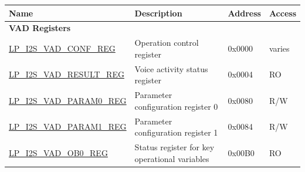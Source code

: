 \begin{longtable}{ | p{6cm} | p{7.2cm} | p{1.3cm} | p{1cm} | }
\hline\rowcolor{lightgray}
\textbf{Name} & \textbf{Description} &  \textbf{Address} & \textbf{Access} \\ \hline
\endhead
\multicolumn{4}{|l|}{\textbf{VAD  Registers}} \\ \hline
\hyperref[regdesc:LPI2SVADCONFREG]{LP\_I2S\_VAD\_CONF\_REG} & Operation control register & 0x0000 & varies \\ \hline
\hyperref[regdesc:LPI2SVADRESULTREG]{LP\_I2S\_VAD\_RESULT\_REG} & Voice activity status register & 0x0004 & RO \\ \hline
\hyperref[regdesc:LPI2SVADPARAM0REG]{LP\_I2S\_VAD\_PARAM0\_REG} & Parameter configuration register 0 & 0x0080 & R/W \\ \hline
\hyperref[regdesc:LPI2SVADPARAM1REG]{LP\_I2S\_VAD\_PARAM1\_REG} & Parameter configuration register 1 & 0x0084 & R/W \\ \hline
\hyperref[regdesc:LPI2SVADOB0REG]{LP\_I2S\_VAD\_OB0\_REG} & Status register for key operational variables & 0x00B0 & RO \\ \hline
\end{longtable}
